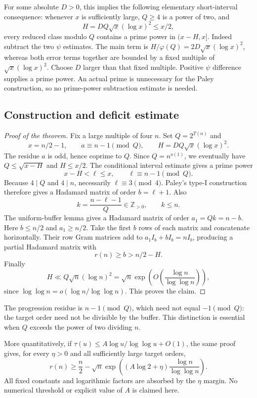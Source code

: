 \documentclass[11pt]{article}
\begin{document}
For some absolute $D>0$, this implies the following elementary
short-interval consequence: whenever $x$ is sufficiently large,
$Q\ge4$ is a power of two, and
\[
 H=DQ\sqrt x(\log x)^2\le x/2,
\]
every reduced class modulo $Q$ contains a prime power in $(x-H,x]$.
Indeed subtract the two $\psi$ estimates. The main term is
$H/\varphi(Q)=2D\sqrt x(\log x)^2$, whereas both error terms
together are bounded by a fixed multiple of
$\sqrt x(\log x)^2$. Choose $D$ larger than that fixed multiple.
Positive $\psi$ difference supplies a prime power. An actual prime
is unnecessary for the Paley construction, so no prime-power
subtraction estimate is needed.

\subsection{Construction and deficit estimate}
\begin{proof}[Proof of the theorem]
Fix a large multiple of four $n$. Set $Q=2^{T(n)}$ and
\[
 x=n/2-1,\qquad a\equiv n-1\pmod Q,\qquad
 H=DQ\sqrt x(\log x)^2.
\]
The residue $a$ is odd, hence coprime to $Q$. Since $Q=n^{o(1)}$,
we eventually have $Q\le\sqrt{x-H}$ and $H\le x/2$.
The conditional interval estimate gives a prime power
\[
 x-H<\ell\le x,\qquad \ell\equiv n-1\pmod Q.
\]
Because $4\mid Q$ and $4\mid n$, necessarily $\ell\equiv3\pmod4$.
Paley's type-I construction therefore gives a Hadamard matrix of
order $b=\ell+1$. Also
\[
 k=\frac{n-\ell-1}{Q}\in\mathbb Z_{>0},\qquad k\le n.
\]
The uniform-buffer lemma gives a Hadamard matrix of order
$a_1=Qk=n-b$. Here $b\le n/2$ and $a_1\ge n/2$.
Take the first $b$ rows of each matrix and concatenate horizontally.
Their row Gram matrices add to
$a_1I_b+bI_b=nI_b$, producing a partial Hadamard matrix with
\[
 r(n)\ge b>n/2-H.
\]
Finally
\[
 H\ll Q\sqrt n(\log n)^2
   =\sqrt n\exp\!\left(O\!\left(\frac{\log n}{\log\log n}\right)\right),
\]
since $\log\log n=o(\log n/\log\log n)$. This proves the claim.
\end{proof}

The progression residue is $n-1\pmod Q$, which need not equal
$-1\pmod Q$: the target order need not be divisible by the buffer.
This distinction is essential when $Q$ exceeds the power of two
dividing $n$.

More quantitatively, if
$\tau(u)\le A\log u/\log\log u+O(1)$, the same proof gives,
for every $\eta>0$ and all sufficiently large target orders,
\[
 r(n)\ge\frac n2-
 \sqrt n\exp\!\left((A\log2+\eta)
                 \frac{\log n}{\log\log n}\right).
\]
All fixed constants and logarithmic factors are absorbed by the
$\eta$ margin. No numerical threshold or explicit value of $A$
is claimed here.
\end{document}
